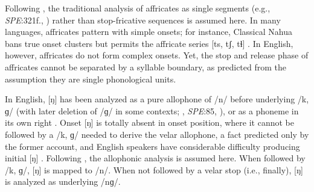 Following \citet{Pierrehumbert1994}, the traditional analysis of affricates as single segments (e.g., \emph{SPE}:321f., \citealp[24]{Jakobson1961}) rather than stop-fricative sequences \citep[e.g.,][]{Hualde1988,Lombardi1990} is assumed here. In many languages, affricates pattern with simple onsets; for instance, Classical Nahua bans true onset clusters but permits the affricate series [ts, tʃ, tɬ] \citep[9]{Launey2011}. In English, however, affricates do not form complex onsets. Yet, the stop and release phase of affricates cannot be separated by a syllable boundary, as predicted from the assumption they are single phonological units.

In English, [ŋ] has been analyzed as a pure allophone of /n/ before underlying /k, ɡ/ (with later deletion of /ɡ/ in some contexts; \citealt[65f.]{Borowsky1986}, \emph{SPE}:85, \citealt[62]{Halle1985a}), or as a phoneme in its own right \citep[e.g.,][]{Jusczyk2002,Sapir1925}. Onset [ŋ] is totally absent in onset position, where it cannot be followed by a /k, ɡ/ needed to derive the velar allophone, a fact predicted only by the former account, and English speakers have considerable difficulty producing initial [ŋ] \citep{Rusaw2009}. Following \citet{Pierrehumbert1994}, the allophonic analysis is assumed here. When followed by /k, ɡ/, [ŋ] is mapped to /n/. When not followed by a velar stop (i.e., finally), [ŋ] is analyzed as underlying /nɡ/.

% 
% 
